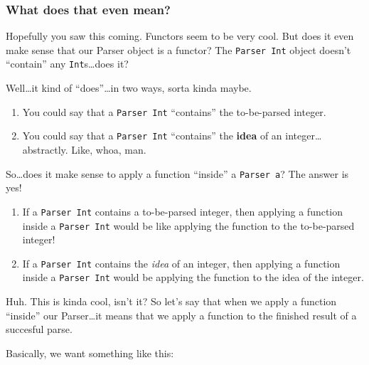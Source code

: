\documentclass[]{article}
\newenvironment{Shaded}{}{}
\newcommand{\DataTypeTok}[1]{\textcolor[rgb]{0.56,0.13,0.00}{#1}}
\newcommand{\DecValTok}[1]{\textcolor[rgb]{0.25,0.63,0.44}{#1}}
\newcommand{\FunctionTok}[1]{\textcolor[rgb]{0.02,0.16,0.49}{#1}}
\newcommand{\KeywordTok}[1]{\textcolor[rgb]{0.00,0.44,0.13}{\textbf{#1}}}
\newcommand{\NormalTok}[1]{#1}
\newcommand{\OtherTok}[1]{\textcolor[rgb]{0.00,0.44,0.13}{#1}}
\newcommand{\StringTok}[1]{\textcolor[rgb]{0.25,0.44,0.63}{#1}}
\begin{document}
\hypertarget{what-does-that-even-mean}{%
\subsubsection{What does that even mean?}\label{what-does-that-even-mean}}

Hopefully you saw this coming. Functors seem to be very cool. But does it even
make sense that our Parser object is a functor? The \texttt{Parser\ Int} object
doesn't ``contain'' any \texttt{Int}s\ldots{}does it?

Well\ldots{}it kind of ``does''\ldots{}in two ways, sorta kinda maybe.

\begin{enumerate}
\def\labelenumi{\arabic{enumi}.}
\tightlist
\item
  You could say that a \texttt{Parser\ Int} ``contains'' the to-be-parsed
  integer.
\item
  You could say that a \texttt{Parser\ Int} ``contains'' the \textbf{idea} of an
  integer\ldots{}abstractly. Like, whoa, man.
\end{enumerate}

So\ldots{}does it make sense to apply a function ``inside'' a
\texttt{Parser\ a}? The answer is yes!

\begin{enumerate}
\def\labelenumi{\arabic{enumi}.}
\tightlist
\item
  If a \texttt{Parser\ Int} contains a to-be-parsed integer, then applying a
  function inside a \texttt{Parser\ Int} would be like applying the function to
  the to-be-parsed integer!
\item
  If a \texttt{Parser\ Int} contains the \emph{idea} of an integer, then
  applying a function inside a \texttt{Parser\ Int} would be applying the
  function to the idea of the integer.
\end{enumerate}

Huh. This is kinda cool, isn't it? So let's say that when we apply a function
``inside'' our Parser\ldots{}it means that we apply a function to the finished
result of a succesful parse.

Basically, we want something like this:

\begin{Shaded}
\end{Shaded}
\end{document}
